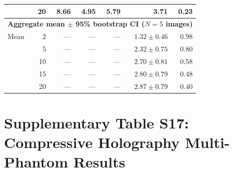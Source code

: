 \documentclass[11pt]{article}
\theoremstyle{definition}
\begin{document}
\begin{table}[htbp]
\begin{tabular}{l r r r r r r}
                & 20 &  8.66 &  4.95 &  5.79 & 3.71 & 0.23 \\
\midrule
\multicolumn{7}{l}{\textbf{Aggregate mean $\pm$ 95\% bootstrap CI ($N{=}5$ images)}} \\
\midrule
Mean   &  2 & --- & --- & --- & $1.32 \pm 0.46$ & 0.98 \\
       &  5 & --- & --- & --- & $2.32 \pm 0.75$ & 0.80 \\
       & 10 & --- & --- & --- & $2.70 \pm 0.81$ & 0.58 \\
       & 15 & --- & --- & --- & $2.80 \pm 0.79$ & 0.48 \\
       & 20 & --- & --- & --- & $2.87 \pm 0.79$ & 0.40 \\
\bottomrule
\end{tabular}
\end{table}

\section{Supplementary Table S17: Compressive Holography Multi-Phantom Results}
\label{sec:compholo_scenes}
\end{document}
